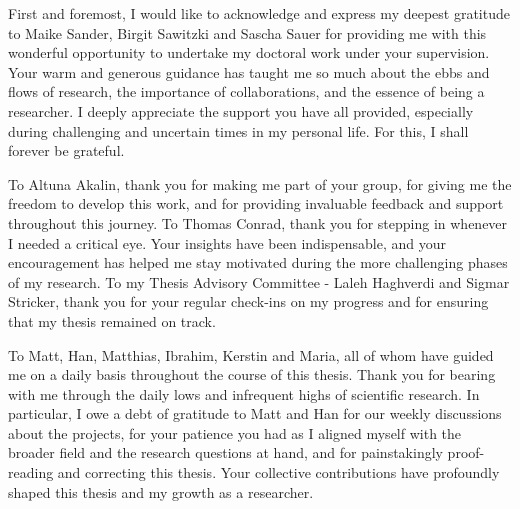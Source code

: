 
\begin{acknowledgements}      


\vspace{0.5cm}
\par First and foremost, I would like to acknowledge and express my deepest gratitude to Maike Sander, Birgit Sawitzki and Sascha Sauer for providing me with this wonderful opportunity to undertake my doctoral work under your supervision. Your warm and generous guidance has taught me so much about the ebbs and flows of research, the importance of collaborations, and the essence of being a researcher. I deeply appreciate the support you have all provided, especially during challenging and uncertain times in my personal life. For this, I shall forever be grateful.\\

\par To Altuna Akalin, thank you for making me part of your group, for giving me the freedom to develop this work, and for providing invaluable feedback and support throughout this journey. To Thomas Conrad, thank you for stepping in whenever I needed a critical eye. Your insights have been indispensable, and your encouragement has helped me stay motivated during the more challenging phases of my research. To my Thesis Advisory Committee - Laleh Haghverdi and Sigmar Stricker, thank you for your regular check-ins on my progress and for ensuring that my thesis remained on track.\\

\par To Matt, Han, Matthias, Ibrahim, Kerstin and Maria, all of whom have guided me on a daily basis throughout the course of this thesis. Thank you for bearing with me through the daily lows and infrequent highs of scientific research. In particular, I owe a debt of gratitude to Matt and Han for our weekly discussions about the projects, for your patience you had as I aligned myself with the broader field and the research questions at hand, and for painstakingly proof-reading and correcting this thesis. Your collective contributions have profoundly shaped this thesis and my growth as a researcher.\\


\end{acknowledgements}
